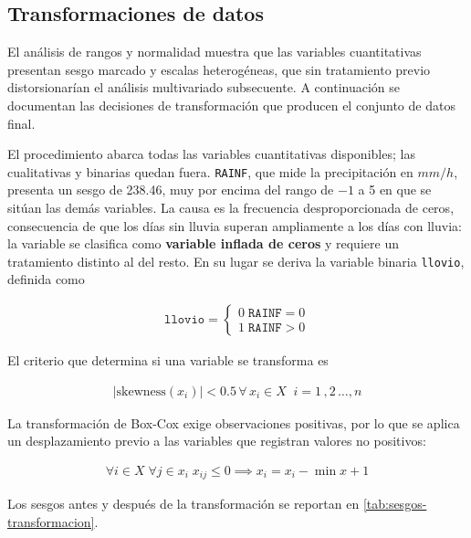 \subsection{Transformaciones de datos}\label{sec:transformaciones}

El análisis de rangos y normalidad muestra que las variables cuantitativas
presentan sesgo marcado y escalas heterogéneas, que sin tratamiento previo
distorsionarían el análisis multivariado subsecuente. A continuación se
documentan las decisiones de transformación que producen el conjunto de datos
final.

El procedimiento abarca todas las variables cuantitativas disponibles; las
cualitativas y binarias quedan fuera. \texttt{RAINF}, que mide la
precipitación en $mm/h$, presenta un sesgo de 238.46, muy por encima del rango
de $-1$ a 5 en que se sitúan las demás variables. La causa es la frecuencia
desproporcionada de ceros, consecuencia de que los días sin lluvia superan
ampliamente a los días con lluvia: la variable se clasifica como
\textbf{variable inflada de ceros} y requiere un tratamiento distinto al del
resto. En su lugar se deriva la variable binaria \texttt{llovio}, definida
como

\begin{align}
     \texttt{llovio}=\begin{cases}
        0\;\texttt{RAINF} = 0\\
        1\;\texttt{RAINF} > 0
    \end{cases}
\end{align}

El criterio que determina si una variable se transforma es

\begin{align}
    |\text{skewness}(x_i)|<0.5\,\forall\, x_i\in X\;\;i=1\,,2\,\dots,n
\end{align}

La transformación de Box-Cox exige observaciones positivas, por lo que se
aplica un desplazamiento previo a las variables que registran valores no
positivos:

\begin{align}
    \forall i\in X\;\forall j\in x_i\;x_{ij} \leq0 \implies x_i = x_i - \min{x} + 1
\end{align}

Los sesgos antes y después de la transformación se reportan en
\cref{tab:sesgos-transformacion}.

